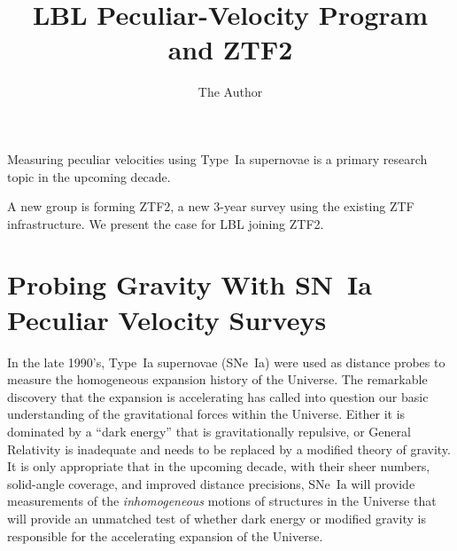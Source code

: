\documentclass[11pt, oneside]{article}   	%
\title{LBL Peculiar-Velocity Program and ZTF2}
\author{The Author}
\begin{document}
\maketitle


Measuring peculiar velocities using Type~Ia supernovae is a primary research topic in the upcoming decade.

A new group is forming ZTF2, a new 3-year survey using the existing ZTF infrastructure.  We present the case for LBL joining ZTF2.

\section{Probing Gravity With SN~Ia  Peculiar Velocity Surveys}
In the late 1990's, Type~Ia supernovae (SNe~Ia) were used as distance probes to measure the homogeneous expansion history of the Universe.  The remarkable discovery
that the expansion is accelerating  has called into question our basic understanding of the gravitational forces within the Universe.  Either it
is dominated by a ``dark energy'' that is gravitationally repulsive, or General Relativity is inadequate and needs to be replaced by a modified theory of
gravity.  It is only appropriate that in the upcoming decade, with their sheer numbers, solid-angle coverage,
and improved distance precisions, SNe~Ia will provide measurements of the {\it inhomogeneous} motions of structures in the Universe
that will provide an unmatched test of whether dark energy or modified gravity is responsible for the accelerating expansion of the Universe.
\end{document}
